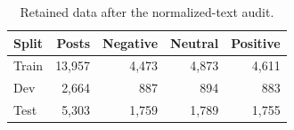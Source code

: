 \begin{table}[t]
\centering
\footnotesize
\caption{Retained data after the normalized-text audit.}
\label{tab:splits}
\begin{tabular}{lrrrr}
\toprule
Split & Posts & Negative & Neutral & Positive \\
\midrule
Train & 13,957 & 4,473 & 4,873 & 4,611 \\
Dev & 2,664 & 887 & 894 & 883 \\
Test & 5,303 & 1,759 & 1,789 & 1,755 \\
\bottomrule
\end{tabular}
\end{table}
